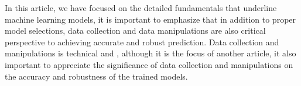 
\par
In this article, we have focused on the detailed fundamentals that underline machine learning models, it is important to emphasize that in addition to proper model selections, data collection and data manipulations are also critical perspective to achieving accurate and robust prediction. Data collection and manipulations is technical and , although it is the focus of another article, it also important to appreciate the significance of data collection and manipulations on the accuracy and robustness of the trained models.
\par 
